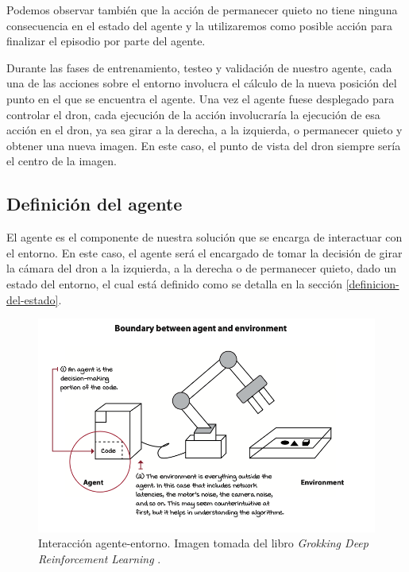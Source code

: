 

Podemos observar también que la acción de permanecer quieto no tiene ninguna consecuencia en el estado del agente y la utilizaremos como posible acción para finalizar el episodio por parte del agente.
\medskip

Durante las fases de entrenamiento, testeo y validación de nuestro agente, cada una de las acciones sobre el entorno involucra el cálculo de la nueva posición del punto en el que se encuentra el agente. Una vez el agente fuese desplegado para controlar el dron, cada ejecución de la acción involucraría la ejecución de esa acción en el dron, ya sea girar a la derecha, a la izquierda, o permanecer quieto y obtener una nueva imagen. En este caso, el punto de vista del dron siempre sería el centro de la imagen.
\medskip

\subsection{Definición del agente}
\label{definicion-del-agente}

El agente es el componente de nuestra solución que se encarga de interactuar con el entorno. En este caso, el agente será el encargado de tomar la decisión de girar la cámara del dron a la izquierda, a la derecha o de permanecer quieto, dado un estado del entorno, el cual está definido como se detalla en la sección \ref{definicion-del-estado}.
\medskip

\begin{figure}[H]
    \centering
    \includegraphics[width=1\textwidth]{figuras/agent_responsabilities.png}
    \caption[Interacción agente-entorno.]{Interacción agente-entorno. Imagen tomada del libro \textit{Grokking Deep Reinforcement Learning} \citet{grokkingreinforcementlearning}.}
    \label{fig-agent-picture}
\end{figure}

